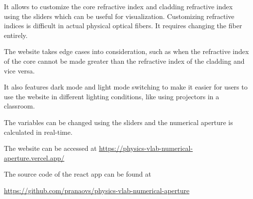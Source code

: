 \documentclass{article}
\theoremstyle{mytheoremstyle}
\theoremstyle{mytheoremstyle}
\theoremstyle{myproblemstyle}
\begin{document}
It allows to customize the core refractive index and cladding refractive index using the sliders which can be useful for visualization.
Customizing refractive indices is difficult in actual physical optical fibers. It requires changing the fiber entirely.

The website takes edge cases into consideration, such as when the refractive index of the core cannot be made greater than the refractive index of the cladding and vice versa.

It also features dark mode and light mode switching to make it easier for users to use the website in different lighting conditions,
like using projectors in a classroom.

The variables can be changed using the sliders and the numerical aperture is calculated in real-time.

The website can be accessed at \url{https://physics-vlab-numerical-aperture.vercel.app/}

The source code of the react app can be found at

\url{https://github.com/pranaovs/physics-vlab-numerical-aperture}
\end{document}
